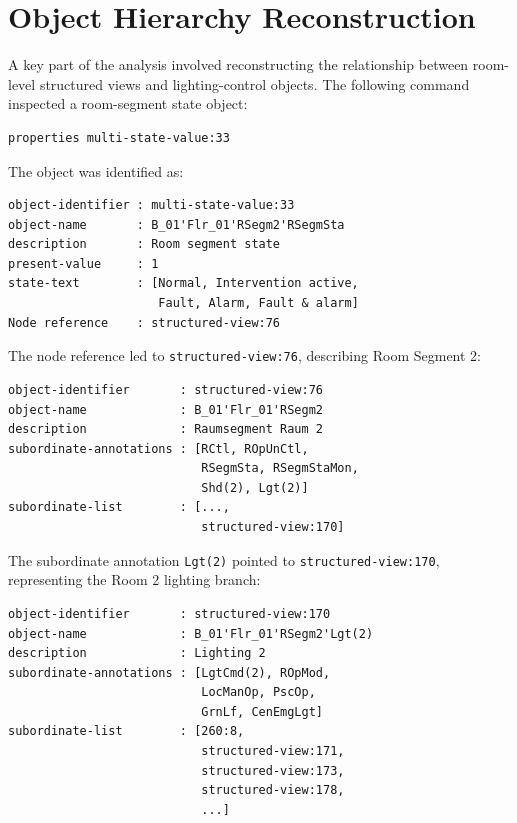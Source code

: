 \documentclass[10pt,conference]{IEEEtran}
\begin{document}
\section{Object Hierarchy Reconstruction}

A key part of the analysis involved reconstructing the relationship between room-level structured views and lighting-control objects. The following command inspected a room-segment state object:

\begin{lstlisting}[style=terminal]
properties multi-state-value:33
\end{lstlisting}

The object was identified as:

\begin{lstlisting}[style=terminal,caption={Room segment state object.}]
object-identifier : multi-state-value:33
object-name       : B_01'Flr_01'RSegm2'RSegmSta
description       : Room segment state
present-value     : 1
state-text        : [Normal, Intervention active,
                     Fault, Alarm, Fault & alarm]
Node reference    : structured-view:76
\end{lstlisting}

The node reference led to \texttt{structured-view:76}, describing Room Segment 2:

\begin{lstlisting}[style=terminal,caption={Structured view for Room Segment 2.}]
object-identifier       : structured-view:76
object-name             : B_01'Flr_01'RSegm2
description             : Raumsegment Raum 2
subordinate-annotations : [RCtl, ROpUnCtl,
                           RSegmSta, RSegmStaMon,
                           Shd(2), Lgt(2)]
subordinate-list        : [...,
                           structured-view:170]
\end{lstlisting}

The subordinate annotation \texttt{Lgt(2)} pointed to \texttt{structured-view:170}, representing the Room 2 lighting branch:

\begin{lstlisting}[style=terminal,caption={Room 2 lighting structured view.}]
object-identifier       : structured-view:170
object-name             : B_01'Flr_01'RSegm2'Lgt(2)
description             : Lighting 2
subordinate-annotations : [LgtCmd(2), ROpMod,
                           LocManOp, PscOp,
                           GrnLf, CenEmgLgt]
subordinate-list        : [260:8,
                           structured-view:171,
                           structured-view:173,
                           structured-view:178,
                           ...]
\end{lstlisting}
\end{document}
